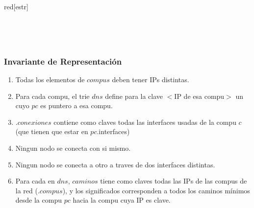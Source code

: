     \begin{Estructura}{red}[estr]

      \begin{Tupla}[estr]
      \end{Tupla}

      ~

      \begin{Tupla}[nodoRed]
      \end{Tupla}

      ~

    	\begin{Tupla}[compu]
    	\end{Tupla}

    \end{Estructura}

\subsubsection{Invariante de Representación}
  \begin{enumerate}

  \item Todas los elementos de $compus$ deben tener IPs distintas.

  \item Para cada compu, el trie $dns$ define para la clave $<$IP de esa compu$>$ un  cuyo $pc$ es puntero a esa compu.

  \item {}.$conexiones$ contiene como claves todas las
        interfaces usadas de la compu $c$ (que tienen que estar en $pc$.interfaces)

  \item Ningun nodo se conecta con si mismo.

  \item Ningun nodo se conecta a otro a traves de dos interfaces distintas.

  \item Para cada  en $dns$, $caminos$ tiene como claves todas las
        IPs de las compus de la red (.$compus$), y los significados corresponden a todos los caminos
        mínimos desde la compu $pc$ hacia la compu cuya IP es clave.

  \end{enumerate}

